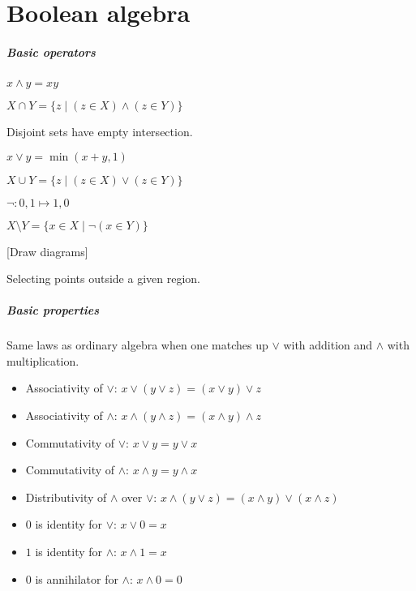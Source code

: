 \section{Boolean algebra}
\subparagraph{Basic operators}
\begin{definition}[Conjonction]
	$x \land y = xy$
\end{definition}
\begin{definition}[Intersection]
	$X \cap Y = \{ z \mid (z \in X) \land (z \in Y) \}$
\end{definition}
\begin{remark}
	Disjoint sets have empty intersection.
\end{remark}
\begin{definition}[Disjunction]
	$x \lor y = \min(x+y,1)$
\end{definition}
\begin{definition}[Union]
	$X \cup Y = \{ z \mid (z \in X) \lor (z \in Y) \}$
\end{definition}
\begin{definition}[Negation]
	$\lnot: 0,1 \mapsto 1,0$
\end{definition}
\begin{definition}
	$X \setminus Y = \{ x \in X \mid \lnot (x \in Y) \}$
\end{definition}
[Draw diagrams]
\begin{question}
	Selecting points outside a given region.
\end{question}
\subparagraph{Basic properties}
\begin{property}
	Same laws as ordinary algebra when one matches up $\lor$ with addition and $\land$ with multiplication.
	\begin{itemize}
		\item Associativity of $\lor$: $x \lor (y \lor z) = (x \lor y) \lor z$
		\item Associativity of $\land$: $x \land (y \land z) = (x \land y) \land z$
		\item Commutativity of $\lor$: $x \lor y  = y \lor x$
		\item Commutativity of $\land$: $x \land y  = y \land x$
		\item Distributivity of $\land$ over $\lor$:  $x \land (y \lor z) = (x \land y) \lor (x \land z)$
		\item $0$ is identity for $\lor$: $x \lor 0  = x$
		\item $1$ is identity for $\land$: $x \land 1  = x$
		\item $0$ is annihilator for $\land$: $x \land 0  = 0$
	\end{itemize}
\end{property}
